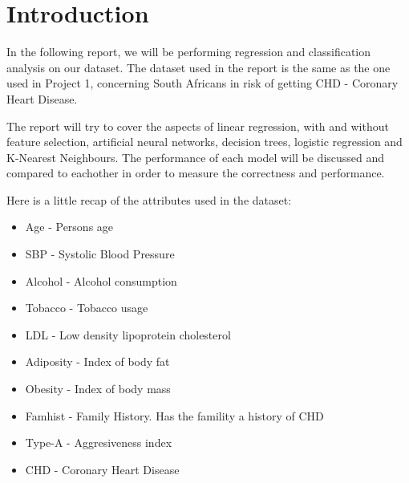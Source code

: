 \section{Introduction}
In the following report, we will be performing regression and classification analysis on our dataset. The dataset used in the report is the same as the one used in Project 1, concerning South Africans in risk of getting CHD - Coronary Heart Disease.

The report will try to cover the aspects of linear regression, with and without feature selection, artificial neural networks, decision trees, logistic regression and K-Nearest Neighbours. The performance of each model will be discussed and compared to eachother in order to measure the correctness and performance.

Here is a little recap of the attributes used in the dataset:
\begin{itemize}
\item Age - Persons age
\item SBP - Systolic Blood Pressure
\item Alcohol - Alcohol consumption
\item Tobacco - Tobacco usage
\item LDL - Low density lipoprotein cholesterol
\item Adiposity - Index of body fat
\item Obesity - Index of body mass
\item Famhist - Family History. Has the famility a history of CHD
\item Type-A - Aggresiveness index
\item CHD - Coronary Heart Disease
\end{itemize}